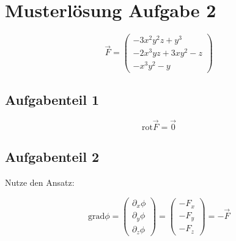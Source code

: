 \section{Musterlösung Aufgabe 2}
\begin{equation*}
\vec{F}=\begin{pmatrix} -3x^2y^2z+y^3 \\ -2x^3yz+3xy^2-z \\ -x^3y^2-y\end{pmatrix}
\end{equation*}

\subsection{Aufgabenteil 1}

\begin{equation*}
\mathrm{rot}\vec{F}=\vec{0}
\end{equation*}

\subsection{Aufgabenteil 2}

Nutze den Ansatz:

\begin{equation*}
\mathrm{grad}\phi=\begin{pmatrix} \partial_x \phi \\ \partial_y \phi \\ \partial_z \phi \end{pmatrix} =\begin{pmatrix} -F_x \\ -F_y \\ -F_z \end{pmatrix}=-\vec{F}
\end{equation*}